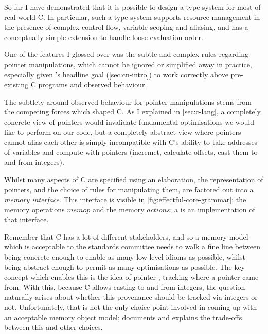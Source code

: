 So far I have demonstrated that it is possible to design a type system for most
of real-world C. In particular, such a type system supports resource management
in the presence of complex control flow, variable scoping and aliasing, and has
a conceptually simple extension to handle loose evaluation order.

One of the features I glossed over was the subtle and complex rules regarding
pointer manipulations, which cannot be ignored or simplified away in practice,
especially given 's headline goal (\cref{sec:cn-intro}) to work
correctly above pre-existing C programs and observed behaviour.

The subtlety around observed behaviour for pointer manipulations stems from the
competing forces which shaped C. As I
explained in \cref{sec:c-lang}, a completely concrete view of pointers would
invalidate fundamental optimisations we would like to perform on our code, but
a completely abstract view where pointers cannot alias each other is simply
incompatible with C's ability to take addresses of variables and compute with
pointers (incremet, calculate offsets, cast them to and from integers).

Whilst many aspects of C are specified using an elaboration, the representation
of pointers, and the choice of rules for manipulating them, are factored out
into a \emph{memory interface}. This interface is visible in
\cref{fig:effectful-core-grammar}: the memory operations $\mathit{memop}$ and
the memory $\mathit{actions}$; a  is an
implementation of that interface.

Remember that C has a lot of different stakeholders, and so a memory model
which is acceptable to the standards committee needs to walk a fine line
between being concrete enough to enable as many low-level idioms as possible,
whilst being abstract enough to permit as many optimisations as possible. The
key concept which enables this is the idea of pointer ,
tracking where a pointer came from. With this, because C allows casting to and
from integers, the question naturally arises about whether this provenance
should be tracked via integers or not. Unfortunately, that is not the only
choice point involved in coming up with an acceptable memory object model;
 documents and explains the trade-offs
between this and other choices.

